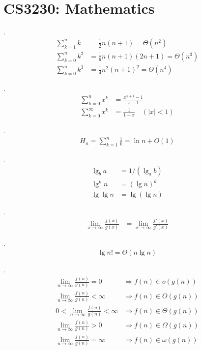 \documentclass[fleqn]{slnotes}
\begin{document}
\chapter{CS3230: Mathematics}

. \begin{align*}
\sum^n_{k=1} k &= \frac{1}{2}n(n+1) = \Theta(n^2)\\
\sum^n_{k=0} k^2 &= \frac{1}{6}n(n+1)(2n+1) = \Theta(n^3)\\
\sum^n_{k=0} k^3 &= \frac{1}{4}n^2{(n+1)}^2 = \Theta(n^4)
\end{align*}

. \begin{align*}
\sum^n_{k=0}x^k &= \frac{x^{n+1}-1}{x-1}\\
\sum^\infty_{k=0}x^k &= \frac{1}{1-x}\quad\left(\left|x\right| < 1\right)
\end{align*}

. \begin{align*}
H_n = \sum^n_{k=1}\frac{1}{k} = \ln n + O(1)
\end{align*}

. \begin{align*}
\lg_b a &= 1/(\lg_a b)\\
\lg^k n &= {(\lg n)}^k\\
\lg \lg n &= \lg (\lg n)
\end{align*}

. \begin{align*}
\lim_{x\to\infty}\frac{f(x)}{g(x)} &= \lim_{x\to\infty}\frac{f'(x)}{g'(x)}
\end{align*}

. \begin{align*}
\lg n! = \Theta(n \lg n)
\end{align*}

. \begin{align*}
\lim_{n\to\infty}\frac{f(n)}{g(n)} = 0 &\Rightarrow f(n) \in o(g(n))\\
\lim_{n\to\infty}\frac{f(n)}{g(n)} < \infty &\Rightarrow f(n) \in O(g(n))\\
0 < \lim_{n\to\infty}\frac{f(n)}{g(n)} < \infty &\Rightarrow f(n) \in \Theta(g(n))\\
\lim_{n\to\infty}\frac{f(n)}{g(n)} > 0 &\Rightarrow f(n) \in \Omega(g(n))\\
\lim_{n\to\infty}\frac{f(n)}{g(n)} = \infty &\Rightarrow f(n) \in \omega(g(n))
\end{align*}
\end{document}
